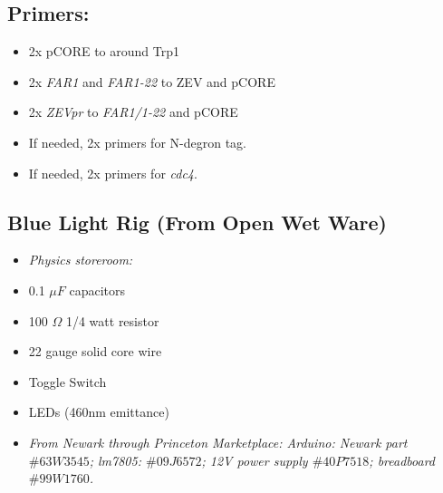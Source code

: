 \documentclass[landscape,a4paper]{article}
\begin{document}
\begin{minipage}[t]{0.3\textwidth}
\subsection*{Primers:}
\begin{itemize}
    \item 2x pCORE to around Trp1
    \item 2x \emph{FAR1} and \emph{FAR1-22} to ZEV and pCORE
    \item 2x \emph{ZEVpr }to \emph{FAR1/1-22 }and pCORE
    \item If needed, 2x primers for N-degron tag.
    \item If needed, 2x primers for \emph{cdc4}.
\end{itemize}

\subsection*{Blue Light Rig (From Open Wet Ware)}
\begin{itemize}
    \item[] \emph{Physics storeroom:}
    \item 0.1 $\mu F$ capacitors
    \item 100 $\Omega$ 1/4 watt resistor
    \item 22 gauge solid core wire
    \item Toggle Switch
    \item LEDs (460nm emittance)
    \item[] \emph{From Newark through Princeton Marketplace: Arduino: Newark part $\#63W3545$; lm7805: $\#09J6572$; 12V power supply $\#40P7518$; breadboard $\#99W1760$.}
\end{itemize}
\end{minipage}
\end{document}
